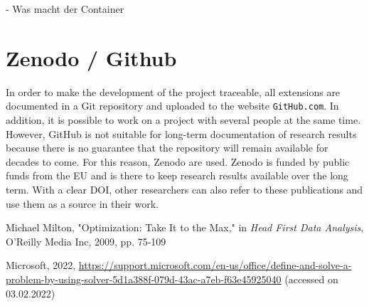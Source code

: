 \documentclass{article}
\begin{document}
\begin{multicols}{2}
- Was macht der Container

\section{Zenodo / Github}
In order to make the development of the project traceable, all extensions are documented in a Git repository and uploaded to the website \texttt{GitHub.com}. In addition, it is possible to work on a project with several people at the same time. However, GitHub is not suitable for long-term documentation of research results because there is no guarantee that the repository will remain available for decades to come. For this reason, Zenodo are used.
Zenodo is funded by public funds from the EU and is there to keep research results available over the long term. With a clear DOI, other researchers can also refer to these publications and use them as a source in their work.


\begin{thebibliography}{2}
  Michael Milton, "Optimization: Take It to the Max," in  \textit{Head First Data Analysis}, O'Reilly Media Inc, 2009, pp. 75-109
 
  Microsoft, 2022, \url{https://support.microsoft.com/en-us/office/define-and-solve-a-problem-by-using-solver-5d1a388f-079d-43ac-a7eb-f63e45925040} (accessed on 03.02.2022)

\end{thebibliography}


\end{multicols}
\end{document}
